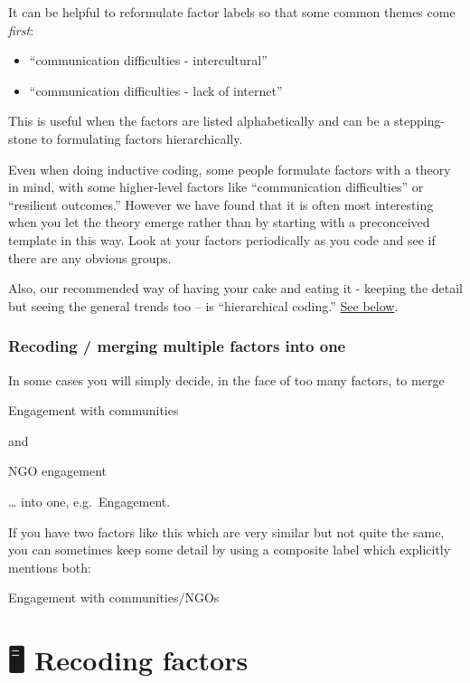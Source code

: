 \documentclass[
]{book}
\providecommand{\tightlist}{%
  \setlength{\itemsep}{0pt}\setlength{\parskip}{0pt}}
\begin{document}
It can be helpful to reformulate factor labels so that some common themes come \emph{first}:

\begin{itemize}
\tightlist
\item
  ``communication difficulties - intercultural''
\item
  ``communication difficulties - lack of internet''
\end{itemize}

This is useful when the factors are listed alphabetically and can be a stepping-stone to formulating factors hierarchically.

Even when doing inductive coding, some people formulate factors with a theory in mind, with some higher-level factors like ``communication difficulties'' or ``resilient outcomes.'' However we have found that it is often most interesting when you let the theory emerge rather than by starting with a preconceived template in this way. Look at your factors periodically as you code and see if there are any obvious groups.

Also, our recommended way of having your cake and eating it - keeping the detail but seeing the general trends too -- is ``hierarchical coding.'' \href{https://guide.causalmap.app/creating.html\#simplifying-causal-maps-with-hierarchical-coding}{See below}.

\hypertarget{recoding-merging-multiple-factors-into-one}{%
\subsection{Recoding / merging multiple factors into one}\label{recoding-merging-multiple-factors-into-one}}

In some cases you will simply decide, in the face of too many factors, to merge

Engagement with communities

and

NGO engagement

\ldots{} into one, e.g.~Engagement.

If you have two factors like this which are very similar but not quite the same, you can sometimes keep some detail by using a composite label which explicitly mentions both:

Engagement with communities/NGOs

\hypertarget{recoding-factors}{%
\chapter{🖥 Recoding factors}\label{recoding-factors}}
\end{document}

